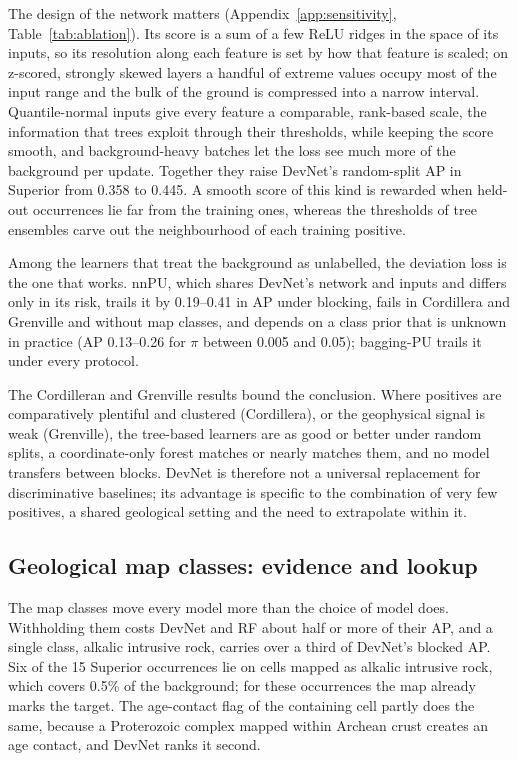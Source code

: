 \documentclass[pdflatex,sn-apa]{sn-jnl}
\begin{document}
The design of the network matters (Appendix~\ref{app:sensitivity}, Table~\ref{tab:ablation}). Its score is a sum of a few ReLU ridges in the space of its inputs, so its resolution along each feature is set by how that feature is scaled; on z-scored, strongly skewed layers a handful of extreme values occupy most of the input range and the bulk of the ground is compressed into a narrow interval. Quantile-normal inputs give every feature a comparable, rank-based scale, the information that trees exploit through their thresholds, while keeping the score smooth, and background-heavy batches let the loss see much more of the background per update. Together they raise DevNet's random-split AP in Superior from 0.358 to 0.445. A smooth score of this kind is rewarded when held-out occurrences lie far from the training ones, whereas the thresholds of tree ensembles carve out the neighbourhood of each training positive.

Among the learners that treat the background as unlabelled, the deviation loss is the one that works. nnPU, which shares DevNet's network and inputs and differs only in its risk, trails it by 0.19--0.41 in AP under blocking, fails in Cordillera and Grenville and without map classes, and depends on a class prior that is unknown in practice (AP 0.13--0.26 for $\pi$ between 0.005 and 0.05); bagging-PU trails it under every protocol.

The Cordilleran and Grenville results bound the conclusion. Where positives are comparatively plentiful and clustered (Cordillera), or the geophysical signal is weak (Grenville), the tree-based learners are as good or better under random splits, a coordinate-only forest matches or nearly matches them, and no model transfers between blocks. DevNet is therefore not a universal replacement for discriminative baselines; its advantage is specific to the combination of very few positives, a shared geological setting and the need to extrapolate within it.

\subsection{Geological map classes: evidence and lookup}\label{sec:disc-mapclasses}

The map classes move every model more than the choice of model does. Withholding them costs DevNet and RF about half or more of their AP, and a single class, alkalic intrusive rock, carries over a third of DevNet's blocked AP. Six of the 15 Superior occurrences lie on cells mapped as alkalic intrusive rock, which covers 0.5\% of the background; for these occurrences the map already marks the target. The age-contact flag of the containing cell partly does the same, because a Proterozoic complex mapped within Archean crust creates an age contact, and DevNet ranks it second.
\end{document}
